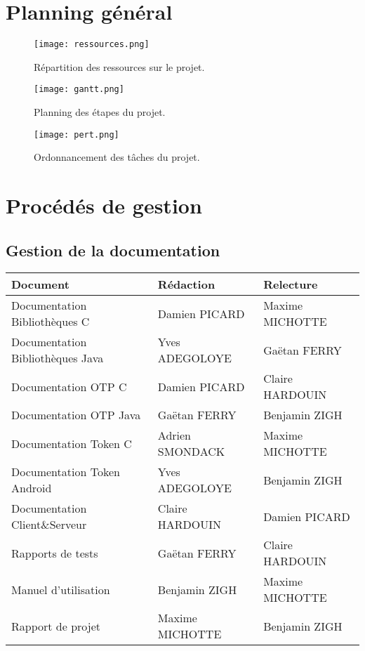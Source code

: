 \documentclass{../../res/univ-projet}
\begin{document}
\newpage
\section{Planning général}

\begin{figure}[h]
\texttt{[image: ressources.png]}
\caption{Répartition des ressources sur le projet.}
\end{figure}
\begin{figure}[h]
\texttt{[image: gantt.png]}
\caption{Planning des étapes du projet.}
\end{figure}

\begin{figure}[h]
\texttt{[image: pert.png]}
\caption{Ordonnancement des tâches du projet.}
\end{figure}

\newpage


\section{Procédés de gestion}
\subsection{Gestion de la documentation}
\begin{tabular}{|l|l|l|}
 \hline
 Document & Rédaction & Relecture \\
 \hline
 Documentation Bibliothèques C & Damien PICARD & Maxime MICHOTTE\\
 Documentation Bibliothèques Java & Yves ADEGOLOYE & Gaëtan FERRY\\
 Documentation OTP C & Damien PICARD & Claire HARDOUIN\\
 Documentation OTP Java & Gaëtan FERRY & Benjamin ZIGH \\
 Documentation Token C & Adrien SMONDACK & Maxime MICHOTTE\\
 Documentation Token Android & Yves ADEGOLOYE & Benjamin ZIGH\\
 Documentation Client\&Serveur & Claire HARDOUIN & Damien PICARD \\
 Rapports de tests & Gaëtan FERRY & Claire HARDOUIN \\
 Manuel d'utilisation & Benjamin ZIGH & Maxime MICHOTTE \\
 Rapport de projet & Maxime MICHOTTE & Benjamin ZIGH \\
 \hline
 
\end{tabular}
\end{document}
